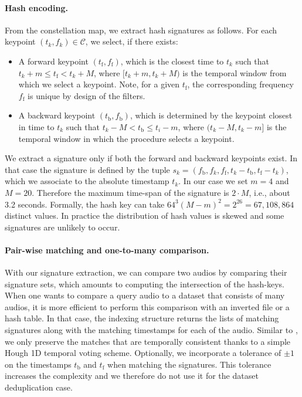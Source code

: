 \paragraph{Hash encoding.} 
From the constellation map, we extract hash signatures as follows. For each keypoint $(t_k, f_k) \in \mathcal C$, we select, if there exists:
\begin{itemize}
\item A forward keypoint $(t_\mathrm{f},f_\mathrm{f})$, which is the closest time to $t_k$ such that $t_k+m \leq t_\mathrm{f} < t_k+M$, where $[t_k+m,t_k+M)$ is the temporal window from which we select a keypoint. Note, for a given $t_\mathrm{f}$, the corresponding frequency $f_\mathrm{f}$ is unique by design of the filters. 
\item A backward keypoint $(t_\mathrm{b},f_\mathrm{b})$, which is determined by the keypoint closest in time to $t_k$ such that $t_k-M < t_\mathrm{b} \leq t_i-m$, where $(t_k-M,t_k-m]$ is the temporal window in which the procedure selects a keypoint. 
\end{itemize}

We extract a signature only if both the forward and backward keypoints exist. In that case the signature is defined by the tuple $s_k=(f_\mathrm{b},f_k,f_\mathrm{f},t_k-t_\mathrm{b},t_\mathrm{f}-t_k)$, which we associate to the absolute timestamp $t_k$. 
In our case we set $m=4$ and $M=20$. Therefore the maximum time-span of the signature is $2\cdot M$, i.e., about 3.2 seconds. 
Formally, the hash key can take $64^3 (M-m)^2 = 2^{26} = 67,108,864$ distinct values. In practice the distribution of hash values is skewed and some signatures are unlikely to occur. 
 

\paragraph{Pair-wise matching and one-to-many comparison.} With our signature extraction, we can compare two audios by comparing their signature sets, which amounts to computing the intersection of the hash-keys. When one wants to compare a query audio to a dataset that consists of many audios, it is more efficient to perform this comparison with an inverted file or a hash table. In that case, the indexing structure returns the lists of matching signatures along with the matching timestamps for each of the audio. Similar to \cite{wang2003industrial}, we only preserve the matches that are temporally consistent thanks to a simple Hough 1D temporal voting scheme. Optionally, we incorporate a tolerance of $\pm 1$ on the timestamps $t_\mathrm{b}$ and $t_\mathrm{f}$ when matching the signatures. This tolerance increases the complexity and we therefore do not use it for the dataset deduplication case. 

